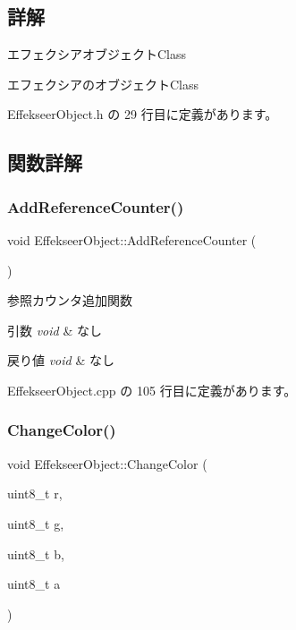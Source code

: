 \subsection{詳解}
エフェクシアオブジェクト\+Class 

エフェクシアのオブジェクト\+Class 

 Effekseer\+Object.\+h の 29 行目に定義があります。



\subsection{関数詳解}
\mbox{\label{class_effekseer_object_aeacb87988d36d3c255cbf53631ad715f}} 
\subsubsection{\texorpdfstring{Add\+Reference\+Counter()}{AddReferenceCounter()}}
{\footnotesize\ttfamily void Effekseer\+Object\+::\+Add\+Reference\+Counter (\begin{DoxyParamCaption}{ }\end{DoxyParamCaption})}



参照カウンタ追加関数 


\begin{DoxyParams}{引数}
{\em void} & なし \\
\hline
\end{DoxyParams}

\begin{DoxyRetVals}{戻り値}
{\em void} & なし \\
\hline
\end{DoxyRetVals}


 Effekseer\+Object.\+cpp の 105 行目に定義があります。

\mbox{\label{class_effekseer_object_aa3fbff4e565c771d1b8e2a83b197294b}} 
\subsubsection{\texorpdfstring{Change\+Color()}{ChangeColor()}}
{\footnotesize\ttfamily void Effekseer\+Object\+::\+Change\+Color (\begin{DoxyParamCaption}\item[{uint8\+\_\+t}]{r,  }\item[{uint8\+\_\+t}]{g,  }\item[{uint8\+\_\+t}]{b,  }\item[{uint8\+\_\+t}]{a }\end{DoxyParamCaption})}



